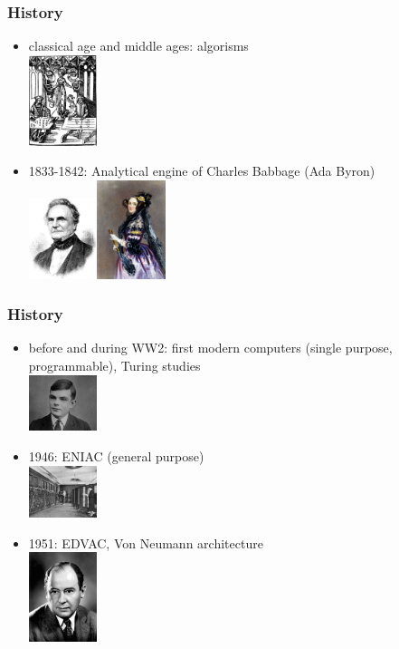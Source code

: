\documentclass[pdftex, 11pt]{beamer}
\begin{document}
\begin{frame}
  \frametitle{History}
  \begin{itemize}
  \item classical age and middle ages: \alert{algorisms} \\\includegraphics[width=2cm]{img/algorism.png}
  \item 1833-1842: \alert{Analytical engine} of Charles
    Babbage (Ada Byron) \\\includegraphics[width=2cm]{img/babbage.jpg}\includegraphics[width=2cm]{img/lovelace.jpg}
  \end{itemize}
\end{frame}

\begin{frame}
  \frametitle{History}
  \begin{itemize}
  \item before and during WW2: first modern computers (single purpose,
    programmable), \alert{Turing} studies \\\includegraphics[width=2cm]{img/turing.jpg}
  \item 1946: \alert{ENIAC} (general purpose) \\\includegraphics[width=2cm]{img/eniac.jpg}
  \item 1951: \alert{EDVAC}, Von Neumann architecture \\\includegraphics[width=2cm]{img/vonNeumann.png}
  \end{itemize}
\end{frame}
\end{document}
